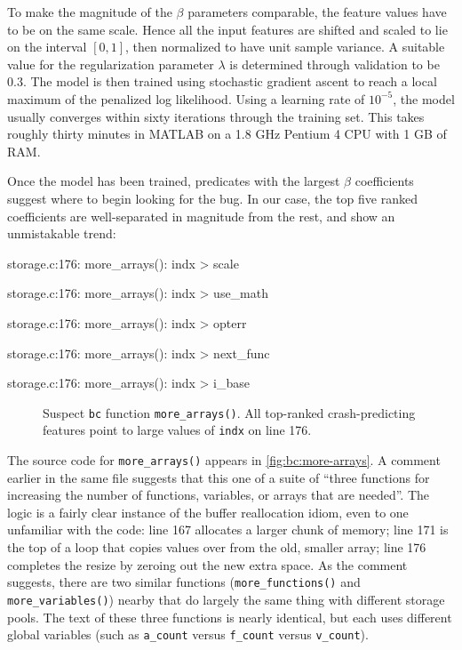 To make the magnitude of the $\beta$ parameters comparable, the feature
values have to be on the same scale.  Hence all the input features are
shifted and scaled to lie on the interval $[0, 1]$, then normalized to
have unit sample variance.  A suitable value for the regularization
parameter $\lambda$ is determined through validation to be $0.3$.  The model
is then trained using stochastic gradient ascent to reach a local
maximum of the penalized log likelihood.  Using a learning rate of
$10^{-5}$, the model usually converges within sixty iterations through
the training set.  This takes roughly thirty minutes in MATLAB on a
1.8 GHz Pentium 4 CPU with 1 GB of RAM.

Once the model has been trained, predicates with the largest $\beta$
coefficients suggest where to begin looking for the bug.  In our case,
the top five ranked coefficients are well-separated in magnitude from
the rest, and show an unmistakable trend:

\begin{features}
\item storage.c:176: more\_arrays(): indx > scale
\item storage.c:176: more\_arrays(): indx > use\_math
\item storage.c:176: more\_arrays(): indx > opterr
\item storage.c:176: more\_arrays(): indx > next\_func
\item storage.c:176: more\_arrays(): indx > i\_base
\end{features}

\begin{figure}
  \centering
  \caption{Suspect \texttt{bc} function \texttt{more\_arrays()}.  All
  top-ranked crash-predicting features point to large values of
  \texttt{indx} on line 176.}
  \label{fig:bc:more-arrays}
\end{figure}

The source code for \texttt{more\_arrays()} appears in
\autoref{fig:bc:more-arrays}.  A comment earlier in the same file
suggests that this one of a suite of ``three functions for increasing
the number of functions, variables, or arrays that are needed''.  The
logic is a fairly clear instance of the buffer reallocation idiom,
even to one unfamiliar with the code: line 167 allocates a larger
chunk of memory; line 171 is the top of a loop that copies values over
from the old, smaller array; line 176 completes the resize by zeroing
out the new extra space.  As the comment suggests, there are two
similar functions (\texttt{more\_functions()} and
\texttt{more\_variables()}) nearby that do largely the same thing with
different storage pools.  The text of these three functions is nearly
identical, but each uses different global variables (such as
\texttt{a\_count} versus \texttt{f\_count} versus \texttt{v\_count}).

